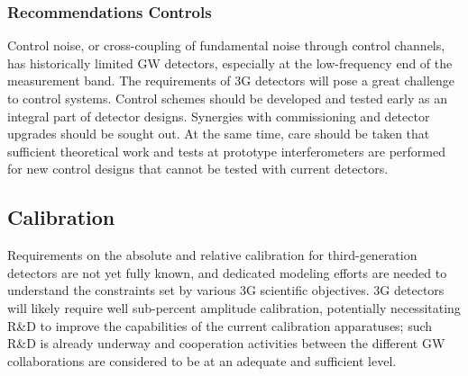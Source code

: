 \subsubsection{Recommendations Controls}
Control noise, or cross-coupling of fundamental noise through control channels, has historically limited GW detectors, especially at the low-frequency end of the measurement band. The requirements of 3G detectors will pose a great challenge to control systems. Control schemes should be developed and tested early as an integral part of detector designs. Synergies with commissioning and detector upgrades should be sought out. At the same time, care should be taken that sufficient theoretical work and tests at prototype interferometers are performed for new control designs that cannot be tested with current detectors.

\subsection{Calibration}

Requirements on the absolute and relative calibration for third-generation detectors are not yet fully known, and dedicated modeling efforts are needed to understand the constraints set by various 3G scientific objectives. 3G detectors will likely require well sub-percent amplitude calibration, potentially necessitating R\&D to improve the capabilities of the current calibration apparatuses; such R\&D is already underway and cooperation activities between the different GW collaborations are considered to be at an adequate and sufficient level. 

%